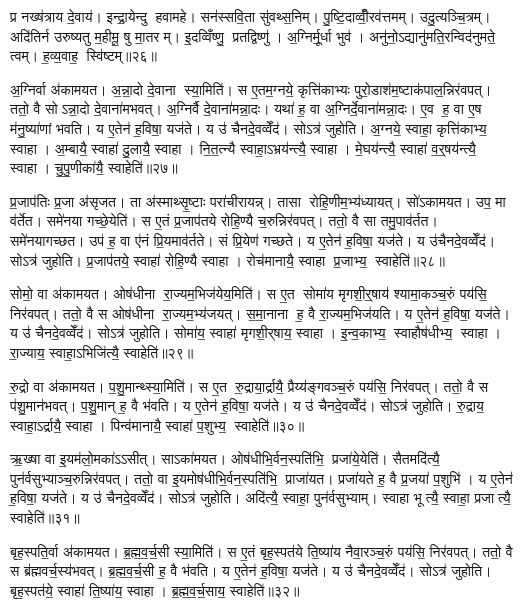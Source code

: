 प्र नख्ष॑त्राय दे॒वाय॑। इन्द्रा॒येन्दु हवामहे। सन॑स्सवि॒ता सु॑वथ्स॒निम्। पु॒ष्टि॒दाव्वीँ॒रव॑त्तमम्। उदु॒त्यञ्चि॒त्रम्। अदि॑तिर्न उरुष्यतु म॒हीमू॒ षु मा॒तरम्। इ॒दव्विँष्णु॒ प्रतद्विष्णु॑। अ॒ग्निर्मू॒र्धा भुव॑। अनु॑नो॒ऽद्यानु॑मति॒रन्विद॑नुमते॒ त्वम्। ह॒व्य॒वाह॒ स्वि॑ष्टम्॥२६॥\anuvakamend[आ॒य॒त्य॑गम॒थ्स्वि॑ष्टम्]

अ॒ग्निर्वा अ॑कामयत। अ॒न्ना॒दो दे॒वाना स्या॒मिति॑। स ए॒तम॒ग्नये॒ कृत्ति॑काभ्यः पुरो॒डाश॑म॒ष्टाक॑पाल॒न्निर॑वपत्। ततो॒ वै सोऽन्ना॒दो दे॒वाना॑मभवत्। अ॒ग्निर्वै दे॒वाना॑मन्ना॒दः। यथा॑ ह॒ वा अ॒ग्निर्दे॒वाना॑मन्ना॒दः। ए॒व ह॒ वा ए॒ष म॑नु॒ष्या॑णां भवति। य ए॒तेन॑ ह॒विषा॒ यज॑ते। य उ॑ चैनदे॒वव्वेँद॑। सोऽत्र॑ जुहोति। अ॒ग्नये॒ स्वाहा॒ कृत्ति॑काभ्य॒ स्वाहा। अ॒म्बायै॒ स्वाहा॑ दु॒लायै॒ स्वाहा। नि॒त॒त्न्यै स्वाहा॒ऽभ्रय॑न्त्यै॒ स्वाहा। मे॒घय॑न्त्यै॒ स्वाहा॑ व॒र्॒षय॑न्त्यै॒ स्वाहा। चु॒पु॒णीका॑यै॒ स्वाहेति॑॥२७॥

प्र॒जाप॑तिः प्र॒जा अ॑सृजत। ता अ॑स्माथ्सृ॒ष्टाः परा॑चीरायन्न्। तासा रोहि॒णीम॒भ्य॑ध्यायत्। सो॑ऽकामयत। उप॒ मा व॑र्तेत। समे॑नया गच्छे॒येति॑। स ए॒तं प्र॒जाप॑तये रोहि॒ण्यै च॒रुन्निर॑वपत्। ततो॒ वै सा तमु॒पाव॑र्तत। समे॑नयागच्छत। उप॑ ह॒ वा ए॑नं प्रि॒यमाव॑र्तते। सं प्रि॒येण॑ गच्छते। य ए॒तेन॑ ह॒विषा॒ यज॑ते। य उ॑चैनदे॒वव्वेँद॑। सोऽत्र॑ जुहोति। प्र॒जाप॑तये॒ स्वाहा॑ रोहि॒ण्यै स्वाहा। रोच॑मानायै॒ स्वाहा प्र॒जाभ्य॒ स्वाहेति॑॥२८॥

सोमो॒ वा अ॑कामयत। ओष॑धीना रा॒ज्यम॒भिज॑येय॒मिति॑। स ए॒त सोमा॑य मृगशी॒र्॒षाय॑ श्यामा॒कञ्च॒रुं पय॑सि॒ निर॑वपत्। ततो॒ वै स ओष॑धीना रा॒ज्यम॒भ्य॑जयत्। स॒मा॒नाना ह॒ वै रा॒ज्यम॒भिज॑यति। य ए॒तेन॑ ह॒विषा॒ यज॑ते। य उ॑ चैनदे॒वव्वेँद॑। सोऽत्र॑ जुहोति। सोमा॑य॒ स्वाहा॑ मृगशी॒र्‌षाय॒ स्वाहा। इ॒न्व॒काभ्य॒ स्वाहौष॑धीभ्य॒ स्वाहा। रा॒ज्याय॒ स्वाहा॒ऽभिजि॑त्यै॒ स्वाहेति॑॥२९॥

रु॒द्रो वा अ॑कामयत। प॒शु॒मान्थ्स्या॒मिति॑। स ए॒त रु॒द्राया॒र्द्रायै॒ प्रैय्य॑ङ्गवञ्च॒रुं पय॑सि॒ निर॑वपत्। ततो॒ वै स प॑शु॒मान॑भवत्। प॒शु॒मान् ह॒ वै भ॑वति। य ए॒तेन॑ ह॒विषा॒ यज॑ते। य उ॑ चैनदे॒वव्वेँद॑। सोऽत्र॑ जुहोति। रु॒द्राय॒ स्वाहा॒ऽर्द्रायै॒ स्वाहा। पिन्व॑मानायै॒ स्वाहा॑ प॒शुभ्य॒ स्वाहेति॑॥३०॥

ऋ॒ख्षा वा इ॒यम॑लो॒मका॑ऽऽसीत्। साऽका॑मयत। ओष॑धीभि॒र्वन॒स्पति॑भि॒ प्रजा॑ये॒येति॑। सैतमदि॑त्यै॒ पुन॑र्वसुभ्याञ्च॒रुन्निर॑वपत्। ततो॒ वा इ॒यमोष॑धीभि॒र्वन॒स्पति॑भि॒ प्राजा॑यत। प्रजा॑यते ह॒ वै प्र॒जया॑ प॒शुभि॑। य ए॒तेन॑ ह॒विषा॒ यज॑ते। य उ॑ चैनदे॒वव्वेँद॑। सोऽत्र॑ जुहोति। अदि॑त्यै॒ स्वाहा॒ पुन॑र्वसुभ्याम्। स्वाहा भूत्यै॒ स्वाहा॒ प्रजात्यै॒ स्वाहेति॑॥३१॥

बृह॒स्पति॒र्वा अ॑कामयत। ब्र॒ह्म॒व॒र्च॒सी स्या॒मिति॑। स ए॒तं बृह॒स्पत॑ये ति॒ष्या॑य नैवा॒रञ्च॒रुं पय॑सि॒ निर॑वपत्। ततो॒ वै स ब्र॑ह्मवर्च॒स्य॑भवत्। ब्र॒ह्म॒व॒र्च॒सी ह॒ वै भ॑वति। य ए॒तेन॑ ह॒विषा॒ यज॑ते। य उ॑ चैनदे॒वव्वेँद॑। सोऽत्र॑ जुहोति। बृह॒स्पत॑ये॒ स्वाहा॑ ति॒ष्या॑य॒ स्वाहा। ब्र॒ह्म॒व॒र्च॒साय॒ स्वाहेति॑॥३२॥


